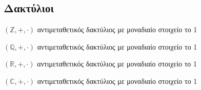 \documentclass[a4paper,table]{report}
\begin{document}
\subsection*{Δακτύλιοι}

\begin{myitemize}
  \item $ (\mathbb{Z}, +,\cdot) $ αντιμεταθετικός δακτύλιος με μοναδιαίο στοιχείο το 1 
  \item $ (\mathbb{Q}, +,\cdot) $ αντιμεταθετικός δακτύλιος με μοναδιαίο στοιχείο το 1 
  \item $ (\mathbb{R}, +,\cdot) $ αντιμεταθετικός δακτύλιος με μοναδιαίο στοιχείο το 1 
  \item $ (\mathbb{C}, +,\cdot) $ αντιμεταθετικός δακτύλιος με μοναδιαίο στοιχείο το 1 
\end{myitemize}
\end{document}
